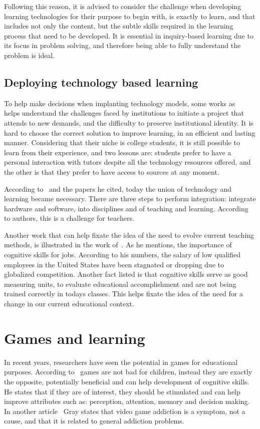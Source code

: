\documentclass[a4paper,twoside]{article}
\begin{document}
Following this reason, it is advised to consider the challenge when developing learning technologies for their purpose to begin with, is exactly to learn, and that includes not only the content, but the subtle skills required in the learning process that need to be developed. It is essential in inquiry-based learning due to its focus in problem solving, and therefore being able to fully understand the problem is ideal.

\subsection{Deploying technology based learning}
\noindent To help make decisions when implanting technology models, some works as~\cite{dahlstrom2013ecar} helps understand the challenges faced by institutions to initiate a project that attends to new demands, and the difficulty to preserve institutional identity. It is hard to choose the correct solution to improve learning, in an efficient and lasting manner. Considering that their niche is college students, it is still possible to learn from their experience, and two lessons are: students prefer to have a personal interaction with tutors despite all the technology resources offered, and the other is that they prefer to have access to sources at any moment.

According to~\cite{watson2013integrating} and the papers he cited, today the union of technology and learning became necessary. There are three steps to perform integration: integrate hardware and software, into disciplines and of teaching and learning. According to authors, this is a challenge for teachers. 

Another work that can help fixate the idea of the need to evolve current teaching methods, is illustrated in the work of~\cite{murnane2007problem}. As he mentions, the importance of cognitive skills for jobs. According to his numbers, the salary of low qualified employees in the United States have been stagnated or dropping due to globalized competition. Another fact listed is that cognitive skills serve as good measuring units, to evaluate educational accomplishment and are not being trained correctly in todays classes. This helps fixate the idea of the need for a change in our current educational context.
\section{Games and learning}
\noindent In recent years, researchers have seen the potential in games for educational purposes. According to~\cite{Cogni10} games are not bad for children, instead they are exactly the opposite, potentially beneficial and can help development of cognitive skills. He states that if they are of interest, they should be stimulated and can help improve attributes such as: perception, attention, memory and decision making. In another article~\cite{Video49} Gray states that video game addiction is a symptom, not a cause, and that it is related to general addiction problems.
\end{document}

